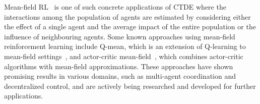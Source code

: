 Mean-field RL~\cite{pmlr-v80-yang18d} is one of such concrete applications of \ac{CTDE} 
 where the interactions among the population of agents are estimated by considering either the effect of a single agent and the average impact of the entire population or the influence of neighbouring agents.
%
Some known approaches using mean-field reinforcement learning include Q-mean, 
 which is an extension of Q-learning to mean-field settings~\cite{yang2018mean}, 
 and actor-critic mean-field~\cite{frikha2023actor}, which combines actor-critic algorithms with mean-field approximations. 
%
These approaches have shown promising results in various domains, such as multi-agent coordination 
 and decentralized control, and are actively being researched and developed for further applications.
